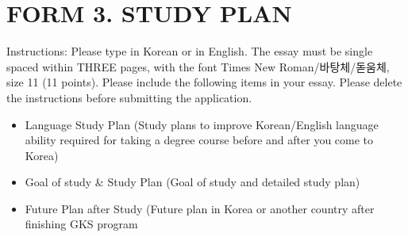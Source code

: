 \documentclass[../main.tex]{subfiles}
\begin{document}
\newpage
\section{FORM 3. STUDY PLAN}%
\label{sec:FORM 3. STUDY PLAN}

\begin{elaboration}
	Instructions: Please type in Korean or in English. The essay must be single spaced within THREE pages, with the font Times New Roman/바탕체/돋움체, size 11 (11 points). Please include the following items in your essay. Please delete the instructions before submitting the application.
	\begin{itemize}
		\item Language Study Plan (Study plans to improve Korean/English language ability required for taking a degree course before and after you come to Korea)
		\item Goal of study \& Study Plan (Goal of study and detailed study plan)
		\item Future Plan after Study (Future plan in Korea or another country after finishing GKS program
	\end{itemize}
\end{elaboration}

% 
\end{document}
